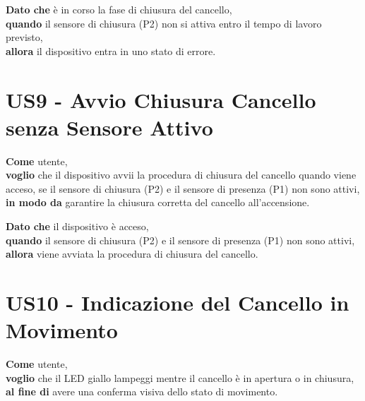 \begin{tcolorbox}[title={Criterio di Accettazione}, colback=blue!20!white, colframe=blue!80!black]
    \textbf{Dato che} è in corso la fase di chiusura del cancello, \\
    \textbf{quando} il sensore di chiusura (P2) non si attiva entro il tempo di lavoro previsto, \\
    \textbf{allora} il dispositivo entra in uno stato di errore.
\end{tcolorbox}

\section{US9 - Avvio Chiusura Cancello senza Sensore Attivo}
\begin{tcolorbox}[title={Descrizione}, colback=red!20!white, colframe=red!80!black]
    \textbf{Come} utente, \\
    \textbf{voglio} che il dispositivo avvii la procedura di chiusura del cancello quando viene acceso, se il sensore di chiusura (P2) e il sensore di presenza (P1) non sono attivi, \\
    \textbf{in modo da} garantire la chiusura corretta del cancello all'accensione.
\end{tcolorbox}

\begin{tcolorbox}[title={Criterio di Accettazione}, colback=blue!20!white, colframe=blue!80!black]
    \textbf{Dato che} il dispositivo è acceso, \\
    \textbf{quando} il sensore di chiusura (P2) e il sensore di presenza (P1) non sono attivi, \\
    \textbf{allora} viene avviata la procedura di chiusura del cancello.
\end{tcolorbox}

\section{US10 - Indicazione del Cancello in Movimento}
\begin{tcolorbox}[title={Descrizione}, colback=red!20!white, colframe=red!80!black]
    \textbf{Come} utente, \\
    \textbf{voglio} che il LED giallo lampeggi mentre il cancello è in apertura o in chiusura, \\
    \textbf{al fine di} avere una conferma visiva dello stato di movimento.
\end{tcolorbox}

